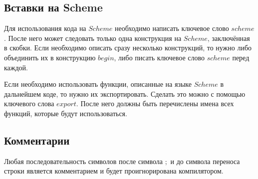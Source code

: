 \subsection{Вставки на Scheme}
    Для использования кода на $Scheme$ необходимо написать ключевое слово $scheme$.
    После него может следовать только одна конструкция на $Scheme$, заключённая в скобки.
    Если необходимо описать сразу несколько конструкций, то нужно либо объединить их в конструкцию $begin$, либо писать ключевое слово $scheme$ перед каждой.
    
    

    Если необходимо использовать функции, описанные на языке $Scheme$ в дальнейшем коде, то нужно их экспортировать.
    Сделать это можно с помощью ключевого слова $export$.
    После него должны быть перечислены имена всех функций, которые будут использоваться.
    
    

\subsection{Комментарии}
    Любая последовательность символов после символа $;$ и до символа переноса строки является комментарием и будет проигнорирована компилятором.
